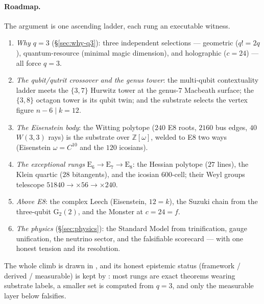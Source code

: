 \documentclass[11pt]{article}
\newcommand{\W}{W(3,3)}
\begin{document}
\paragraph{Roadmap.} The argument is one ascending ladder, each rung an
executable witness.
\begin{enumerate}\itemsep2pt
\item \emph{Why $q=3$} (\S\ref{sec:why-q3}): three independent selections ---
  geometric ($q!=2q$), quantum-resource (minimal magic dimension), and
  holographic ($c=24$) --- all force $q=3$.
\item \emph{The qubit/qutrit crossover and the genus tower}: the multi-qubit
  contextuality ladder meets the $\{3,7\}$ Hurwitz tower at the genus-$7$
  Macbeath surface; the $\{3,8\}$ octagon tower is its qubit twin; and the
  substrate selects the vertex figure $n-6\mid k=12$.
\item \emph{The Eisenstein body}: the Witting polytope ($240$ E8 roots, $2160$
  bus edges, $40$ $\W$ rays) is the substrate over $\mathbb Z[\omega]$, welded
  to E8 two ways (Eisenstein $\omega=C^{10}$ and the $120$ icosians).
\item \emph{The exceptional rungs} $\mathrm E_6\to\mathrm E_7\to\mathrm E_8$:
  the Hessian polytope ($27$ lines), the Klein quartic ($28$ bitangents), and
  the icosian $600$-cell; their Weyl groups telescope $51840\to\times56\to
  \times240$.
\item \emph{Above E8}: the complex Leech (Eisenstein, $12=k$), the Suzuki chain
  from the three-qubit $\mathrm G_2(2)$, and the Monster at $c=24=f$.
\item \emph{The physics} (\S\ref{sec:physics}): the Standard Model from
  trinification, gauge unification, the neutrino sector, and the falsifiable
  scorecard --- with one honest tension and its resolution.
\end{enumerate}
The whole climb is drawn in , and its
honest epistemic status (framework / derived / measurable) is kept by
: most rungs are exact theorems
wearing substrate labels, a smaller set is computed from $q=3$, and only the
measurable layer below falsifies.
\end{document}
